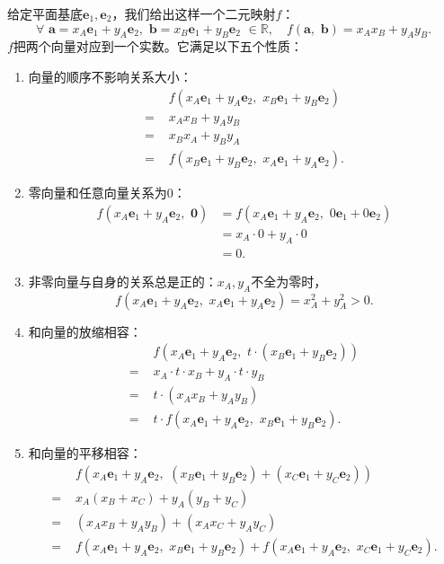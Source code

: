 \documentclass[12pt,UTF8]{ctexbook}
\theoremstyle{definition}
\theoremstyle{plain}
\begin{document}
给定平面基底$\mathbf{e}_1, \mathbf{e}_2$，我们给出这样一个二元映射$f$：
$$ \forall \,\, \mathbf{a} = x_A\mathbf{e}_1 + y_A\mathbf{e}_2, \,\, \mathbf{b} = x_B\mathbf{e}_1 + y_B\mathbf{e}_2 \,\, \in \mathbb{R}, \quad f(\mathbf{a}, \,\, \mathbf{b}) = x_Ax_B + y_Ay_B.$$
$f$把两个向量对应到一个实数。它满足以下五个性质：
\begin{enumerate}
    \item 向量的顺序不影响关系大小：
    \begin{align*}
          & f(x_A\mathbf{e}_1 + y_A\mathbf{e}_2,\,\, x_B\mathbf{e}_1 + y_B\mathbf{e}_2)  \\
        =\,\,& x_Ax_B + y_A y_B  \\
        =\,\,& x_Bx_A + y_By_A  \\
        =\,\,& f(x_B\mathbf{e}_1 + y_B\mathbf{e}_2,\,\, x_A\mathbf{e}_1 + y_A\mathbf{e}_2). 
    \end{align*}
    \item 零向量和任意向量关系为$0$：
    \begin{align*}
        f(x_A\mathbf{e}_1 + y_A\mathbf{e}_2,\,\, \mathbf{0}) &= f(x_A\mathbf{e}_1 + y_A\mathbf{e}_2,\,\, 0\mathbf{e}_1 + 0\mathbf{e}_2)  \\
        &= x_A\cdot 0 + y_A\cdot 0  \\
        &= 0. 
    \end{align*}
    $$$$
    \item 非零向量与自身的关系总是正的：$x_A, y_A$不全为零时，
    $$f(x_A\mathbf{e}_1 + y_A\mathbf{e}_2,\,\, x_A\mathbf{e}_1 + y_A\mathbf{e}_2) = x_A^2 + y_A^2  > 0.$$
    \item 和向量的放缩相容：
    \begin{align*}
        & f(x_A\mathbf{e}_1 + y_A\mathbf{e}_2,\,\, t\cdot (x_B\mathbf{e}_1 + y_B\mathbf{e}_2))  \\
        =\,\,& x_A\cdot t\cdot x_B + y_A\cdot t\cdot y_B  \\
        =\,\,& t\cdot (x_Ax_B + y_Ay_B)  \\
        =\,\,& t\cdot f(x_A\mathbf{e}_1 + y_A\mathbf{e}_2,\,\, x_B\mathbf{e}_1 + y_B\mathbf{e}_2).  
    \end{align*}
    \item 和向量的平移相容：
    \begin{align*}
         & f(x_A\mathbf{e}_1 + y_A\mathbf{e}_2, \,\, (x_B\mathbf{e}_1 + y_B\mathbf{e}_2) + (x_C\mathbf{e}_1 + y_C\mathbf{e}_2))  \\
         =\,\,& x_A(x_B + x_C) + y_A (y_B + y_C)  \\
         =\,\,& (x_Ax_B + y_Ay_B) + (x_Ax_C + y_Ay_C)  \\
         =\,\,& f(x_A\mathbf{e}_1 + y_A\mathbf{e}_2, \,\,x_B\mathbf{e}_1 + y_B\mathbf{e}_2) + f(x_A\mathbf{e}_1 + y_A\mathbf{e}_2, \,\,x_C\mathbf{e}_1 + y_C\mathbf{e}_2). 
    \end{align*}     
\end{enumerate}
\end{document}
